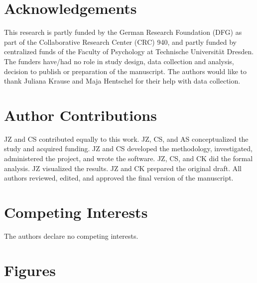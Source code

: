 \documentclass[
  man,floatsintext]{apa6}
\begin{document}
\endgroup

\newpage

\hypertarget{acknowledgements}{%
\section{Acknowledgements}\label{acknowledgements}}

This research is partly funded by the German Research Foundation (DFG) as part of the Collaborative Research Center (CRC) 940, and partly funded by centralized funds of the Faculty of Psychology at Technische Universität Dresden.
The funders have/had no role in study design, data collection and analysis, decision to publish or preparation of the manuscript.
The authors would like to thank Juliana Krause and Maja Hentschel for their help with data collection.

\hypertarget{author-contributions}{%
\section{Author Contributions}\label{author-contributions}}

JZ and CS contributed equally to this work.
JZ, CS, and AS conceptualized the study and acquired funding.
JZ and CS developed the methodology, investigated, administered the project, and wrote the software.
JZ, CS, and CK did the formal analysis.
JZ visualized the results.
JZ and CK prepared the original draft.
All authors reviewed, edited, and approved the final version of the manuscript.

\hypertarget{competing-interests}{%
\section{Competing Interests}\label{competing-interests}}

The authors declare no competing interests.

\newpage

\hypertarget{figures}{%
\section{Figures}\label{figures}}
\end{document}

